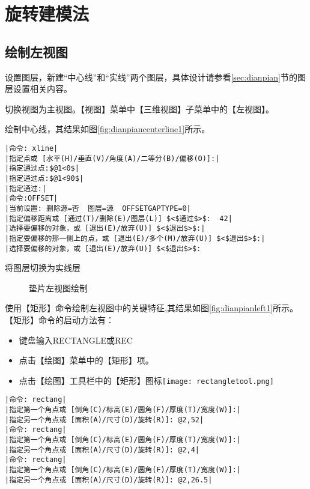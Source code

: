 \section{旋转建模法}
\subsection{绘制左视图}
\begin{procedure}
\item 设置图层，新建“中心线”和“实线”两个图层，具体设计请参看\ref{sec:dianpian}节的图层设置相关内容。
\item  切换视图为主视图。【视图】菜单中【三维视图】子菜单中的【左视图】。
\item 绘制中心线，其结果如图\ref{fig:dianpiancenterline1}所示。
\begin{lstlisting}
|命令: xline|
|指定点或 [水平(H)/垂直(V)/角度(A)/二等分(B)/偏移(O)]:|
|指定通过点:$@1<0$|
|指定通过点:$@1<90$|
|指定通过:|
|命令:OFFSET|
|当前设置: 删除源=否  图层=源  OFFSETGAPTYPE=0|
|指定偏移距离或 [通过(T)/删除(E)/图层(L)] $<$通过$>$:  42|
|选择要偏移的对象，或 [退出(E)/放弃(U)] $<$退出$>$:|
|指定要偏移的那一侧上的点，或 [退出(E)/多个(M)/放弃(U)] $<$退出$>$:|
|选择要偏移的对象，或 [退出(E)/放弃(U)] $<$退出$>$:
\end{lstlisting}
\item 将图层切换为实线层
\begin{figure}[htbp]
\centering
{}\hspace{40pt}
\caption{垫片左视图绘制}
\end{figure}
\item 使用【矩形】命令绘制左视图中的关键特征,其结果如图\ref{fig:dianpianleft1}所示。【矩形】命令的启动方法有：
\begin{itemize}
\item 键盘输入RECTANGLE或REC
\item 点击【绘图】菜单中的【矩形】项。
\item 点击【绘图】工具栏中的【矩形】图标\texttt{[image: rectangletool.png]}
\end{itemize}
\begin{lstlisting}
|命令: rectang|
|指定第一个角点或 [倒角(C)/标高(E)/圆角(F)/厚度(T)/宽度(W)]:|
|指定另一个角点或 [面积(A)/尺寸(D)/旋转(R)]: @2,52|
|命令: rectang|
|指定第一个角点或 [倒角(C)/标高(E)/圆角(F)/厚度(T)/宽度(W)]:|
|指定另一个角点或 [面积(A)/尺寸(D)/旋转(R)]: @2,4|
|命令: rectang|
|指定第一个角点或 [倒角(C)/标高(E)/圆角(F)/厚度(T)/宽度(W)]:|
|指定另一个角点或 [面积(A)/尺寸(D)/旋转(R)]: @2,26.5|
\end{lstlisting}
\end{procedure}

\endinput